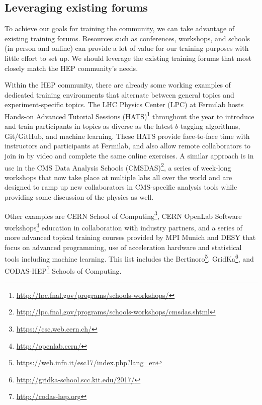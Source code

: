\subsection{Leveraging existing forums}

To achieve our goals for training the community, we can take advantage of existing training forums. Resources such as conferences, workshops, and schools (in person and online) can provide a lot of value for our training purposes with little effort to set up. We should leverage the existing training forums that most closely match the HEP community's needs.

Within the HEP community, there are already some working examples of dedicated training environments that alternate between general topics and experiment-specific topics. The LHC Physics Center (LPC) at Fermilab hosts Hands-on Advanced Tutorial Sessions (HATS)\footnote{\url{http://lpc.fnal.gov/programs/schools-workshops/}} throughout the year to introduce and train participants in topics as diverse as the latest $b$-tagging algorithms, Git/GitHub, and machine learning. These HATS provide face-to-face time with instructors and participants at Fermilab, and also allow remote collaborators to join in by video and complete the same online exercises. A similar approach is in use in the CMS Data Analysis Schools (CMSDAS)\footnote{\url{http://lpc.fnal.gov/programs/schools-workshops/cmsdas.shtml}}, a series of week-long workshops that now take place at multiple labs all over the world and are designed to ramp up new collaborators in CMS-specific analysis tools while providing some discussion of the physics as well. 

Other examples are CERN School of Computing\footnote{\url{https://csc.web.cern.ch/}}, CERN OpenLab Software workshops\footnote{\url{http://openlab.cern/}} education in collaboration with industry partners, and a series of more advanced topical training courses provided by MPI Munich and DESY that focus on advanced programming, use of acceleration hardware and statistical tools including machine learning. This list includes the Bertinoro\footnote{\url{https://web.infn.it/esc17/index.php?lang=en}},  GridKa\footnote{\url{http://gridka-school.scc.kit.edu/2017/}}, and CODAS-HEP\footnote{\url{http://codas-hep.org}} Schools of Computing.


